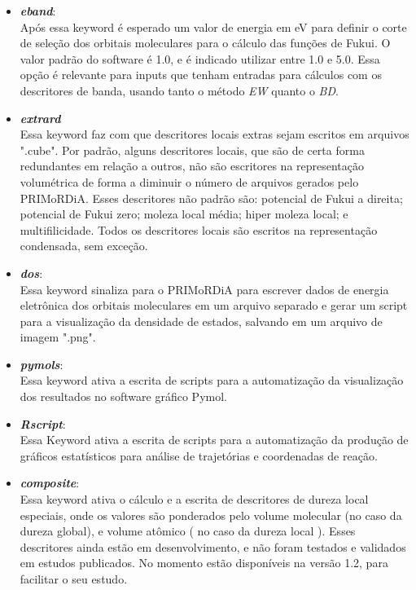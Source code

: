 \documentclass[a4paper,11pt]{refart}
\begin{document}
\begin{itemize}
\item \emph{\textbf{eband}}: \\
Após essa keyword é esperado um valor de energia em eV para definir o corte de seleção dos orbitais moleculares para o cálculo das funções de Fukui. O valor padrão do software é 1.0, e é indicado utilizar entre 1.0 e 5.0. Essa opção é relevante para inputs que tenham entradas para cálculos com os descritores de banda, usando tanto o método \emph{EW} quanto o \emph{BD}.

\item \emph{\textbf{extrard}}\\
Essa keyword faz com que descritores locais extras sejam escritos em arquivos ".cube". Por padrão, alguns descritores locais, que são de certa forma redundantes em relação a outros, não são escritores na representação volumétrica de forma a diminuir o número de arquivos gerados pelo PRIMoRDiA. Esses descritores não padrão são: potencial de Fukui a direita; potencial de Fukui zero; moleza local média; hiper moleza local; e multifilicidade. Todos os descritores locais são escritos na representação condensada, sem exceção. 

\item \emph{\textbf{dos}}:\\
Essa keyword sinaliza para o PRIMoRDiA para escrever dados de energia eletrônica dos orbitais moleculares em um arquivo separado e gerar um script para a visualização da densidade de estados, salvando em um arquivo de imagem ".png". 

\item \emph{\textbf{pymols}}:\\
Essa keyword ativa a escrita de scripts para a automatização da visualização dos resultados no software gráfico Pymol. 

\item \emph{\textbf{Rscript}}:\\
Essa Keyword ativa a escrita de scripts para a automatização da produção de gráficos estatísticos para análise de trajetórias e coordenadas de reação. 

\item \emph{\textbf{composite}}:\\
Essa keyword ativa o cálculo e a escrita de descritores de dureza local especiais, onde os valores são ponderados pelo volume molecular (no caso da dureza global), e volume atômico ( no caso da dureza local ). Esses descritores ainda estão em desenvolvimento, e não foram testados e validados em estudos publicados. No momento estão disponíveis na versão 1.2, para facilitar o seu estudo. 

\end{itemize}
\end{document}

